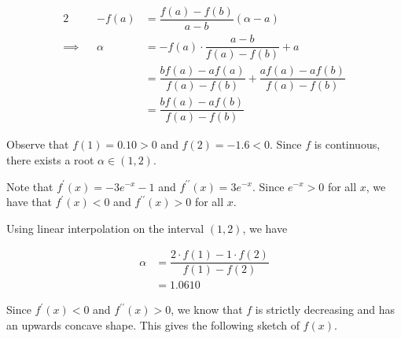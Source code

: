 \documentclass{echw}
\begin{document}
        \begin{alignat*}{2}
            &&-f(a) &= \dfrac{f(a) - f(b)}{a-b} (\alpha - a)\\
            \implies&&\alpha &= -f(a)\cdot\dfrac{a-b}{f(a) - f(b)} + a\\
            && &= \dfrac{bf(a) - af(a)}{f(a) - f(b)} + \dfrac{af(a)-af(b)}{f(a) - f(b)}\\
            && &= \dfrac{bf(a) - af(b)}{f(a) - f(b)}
        \end{alignat*}


        Observe that $f(1) = 0.10 > 0$ and $f(2) = -1.6 < 0$. Since $f$ is continuous, there exists a root $\alpha \in (1, 2)$.

        Note that $f^\prime(x) = -3e^{-x}-1$ and $f^{\prime\prime}(x) = 3e^{-x}$. Since $e^{-x} > 0$ for all $x$, we have that $f^\prime(x) < 0$ and $f^{\prime\prime}(x) > 0$ for all $x$.

        Using linear interpolation on the interval $(1, 2)$, we have

        \begin{equation*}
            \begin{aligned}
                \alpha &= \dfrac{2\cdot f(1) - 1 \cdot f(2)}{f(1) - f(2)} \\
                &= 1.0610
            \end{aligned}
        \end{equation*}


        Since $f^\prime(x) < 0$ and $f^{\prime\prime}(x) > 0$, we know that $f$ is strictly decreasing and has an upwards concave shape. This gives the following sketch of $f(x)$.
\end{document}
